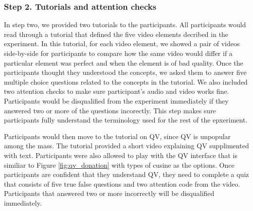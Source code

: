 \subsubsection{Step 2. Tutorials and attention checks}
In step two, we provided two tutorials to the participants. All participants would read through a tutorial that defined the five video elements decribed in the experiment. In this tutorial, for each video element, we showed a pair of videos side-by-side for participants to compare how the same video would differ if a particular element was perfect and when the element is of bad quality. Once the participants thought they understood the concepts, we asked them to answer five multiple choice questions related to the concepts in the tutorial. We also included two attention checks to make sure participant's audio and video works fine. Participants would be disqualified from the experiment immediately if they answered two or more of the questions incorectly. This step makes sure participants fully understand the terminology used for the rest of the epxeriment.

Participants would then move to the tutorial on QV, since QV is unpopular among the mass. The tutorial provided a short video explaining QV supplimented with text. Participants were also allowed to play with the QV interface that is similiar to Figure \ref{fig:qv_donation} with types of cusine as the options. Once participants are confident that they understand QV, they need to complete a quiz that consists of five true false questions and two attention code from the video. Participants that answered two or more incorrectly will be disqualified immediately.

